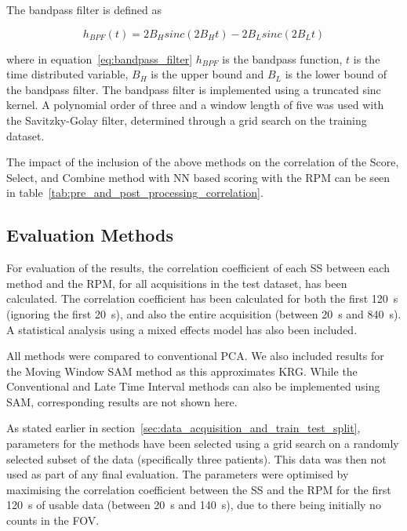             The bandpass filter is defined as

            \begin{equation} \label{eq:bandpass_filter}
                h_{BPF}(t) = 2B_Hsinc(2B_Ht) - 2B_Lsinc(2B_Lt)
            \end{equation}

            \noindent where in equation~\ref{eq:bandpass_filter} $h_{BPF}$ is the bandpass function, $t$ is the time distributed variable, $B_H$ is the upper bound and $B_L$ is the lower bound of the bandpass filter. The bandpass filter is implemented using a truncated sinc kernel. A polynomial order of three and a window length of five was used with the Savitzky-Golay filter, determined through a grid search on the training dataset.

        The impact of the inclusion of the above methods on the correlation of the Score, Select, and Combine method with \gls{NN} based scoring with the \gls{RPM} can be seen in table~\ref{tab:pre_and_post_processing_correlation}.

    \subsection{Evaluation Methods} \label{sec:evaluation_methods}        
        For evaluation of the results, the correlation coefficient of each \gls{SS} between each method and the \gls{RPM}, for all acquisitions in the test dataset, has been calculated. The correlation coefficient has been calculated for both the first \SI{120}{\second} (ignoring the first \SI{20}{\second}), and also the entire acquisition (between \SI{20}{\second} and \SI{840}{\second}). A statistical analysis using a mixed effects model has also been included.
        
        All methods were compared to conventional \gls{PCA}. We also included results for the Moving Window \gls{SAM} method as this approximates \gls{KRG}. While the Conventional and Late Time Interval methods can also be implemented using \gls{SAM}, corresponding results are not shown here.

        As stated earlier in section~\ref{sec:data_acquisition_and_train_test_split}, parameters for the methods have been selected using a grid search on a randomly selected subset of the data (specifically three patients). This data was then not used as part of any final evaluation. The parameters were optimised by maximising the correlation coefficient between the \gls{SS} and the \gls{RPM} for the first \SI{120}{\second} of usable data (between \SI{20}{\second} and \SI{140}{\second}), due to there being initially no counts in the \gls{FOV}.
            
